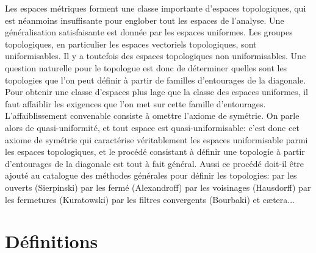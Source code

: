 \documentclass[a4paper, 11pt, french]{book}
\theoremstyle{plain} %
\theoremstyle{definition} %
\theoremstyle{remark} %
\newcommand{\1}{\mathds{1}}
\begin{document}
Les espaces métriques forment une classe importante d'espaces topologiques, qui est néanmoins insuffisante pour englober tout les espaces de l'analyse.
Une généralisation satisfaisante est donnée par les espaces uniformes.
Les groupes topologiques, en particulier les espaces vectoriels topologiques, sont uniformisables.
Il y a toutefois des espaces topologiques non uniformisables.
Une question naturelle pour le topologue est donc de déterminer quelles sont les topologies que l'on peut définir à partir de familles d'entourages de la diagonale.
Pour obtenir une classe d'espaces plus lage que la classe des espaces uniformes, il faut affaiblir les exigences que l'on met sur cette famille d'entourages.
L'affaiblissement convenable consiste à omettre l'axiome de symétrie.
On parle alors de quasi-uniformité, et tout espace est quasi-uniformisable: c'est donc cet axiome de symétrie qui caractérise véritablement les espaces uniformisable parmi les espaces topologiques, et le procédé consistant à définir une topologie à partir d'entourages de la diagonale est tout à fait général.
Aussi ce procédé doit-il être ajouté au catalogue des méthodes générales pour définir les topologies: par les ouverts (Sierpinski) par les fermé (Alexandroff) par les voisinages (Hausdorff) par les fermetures (Kuratowski) par les filtres convergents (Bourbaki) et cætera...
\iffalse
\begin{figure}[h]
	\centering
	\begin{tikzpicture}[scale=4]
		\pgfmathsetmacro{\x}{0.65}
		\pgfmathsetmacro{\y}{0.3}
		\pgfmathsetmacro{\l}{0.25}
		\pgfmathsetmacro{\xx}{0.7}
		\pgfmathsetmacro{\yy}{0.6}
		\pgfmathsetmacro{\yyy}{0.5}
		\draw[black!30!white] (0, 0) rectangle (1, 1);
		\draw[dashed] (0, 0)--(1, 1);
		\draw (\x, \y)--(\x-\l, \y+\l)--(\x-2*\l, \y)--(\x-\l, \y-\l) -- cycle;
		\draw (\xx, \yy)--(\xx+\yy-\yyy, \yyy)--(\xx+2*\yy-2*\yyy, \yy) -- cycle;
		\filldraw[black!30!white]
		(\xx,\y+\x-\yy)--(\xx+\yy-\yyy,\y+\x-\yyy)--
		(\xx+2*\yy-2*\yyy,\y+\x-\yy)--(\xx+2*\yy-2*\yyy,\y-\x+\yy)--
		(\xx+\yy-\yyy,\y-\x+\yyy)--(\xx,\y-\x+\yy)--cycle;
		\node[anchor=east] at (\x, \y) {$F$};
		\node[anchor=south] at (\xx+\yy-\yyy, \yy) {$G$};
		\node[anchor=north] at (\xx+\yy-\yyy,\y-\x+\yyy) {$F\circ G$};
	\end{tikzpicture}
	\caption{$F\circ G$}
\end{figure}
\fi
\section{Définitions}
\end{document}
